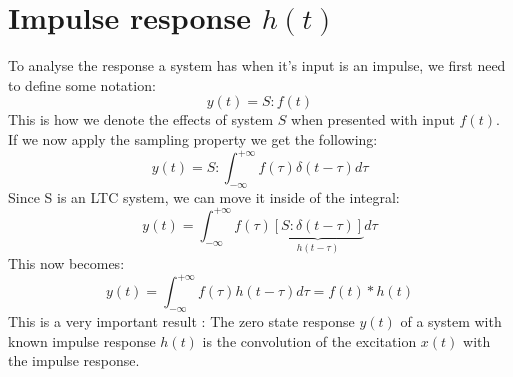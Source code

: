 \documentclass[]{subfiles}
\begin{document}
	\section{Impulse response $h(t)$}
	To analyse the response a system has when it's input is an impulse, we first need to define some notation:
	\begin{equation}
		y(t) = S:f(t)
	\end{equation}
	This is how we denote the effects of  system $S$ when presented with input $f(t)$.   If we now apply the sampling property we get the following:
	\begin{equation}
		y(t)=S:\int_{-\infty}^{+\infty}f(\tau)\delta(t-\tau)d\tau
	\end{equation}
	Since S is an LTC system, we can move it inside of the integral:
	\begin{equation}
		y(t)=\int_{-\infty}^{+\infty}f(\tau)\underbrace{\left[ S:\delta(t-\tau)\right] }_{h(t-\tau)}d\tau
	\end{equation}
	This now becomes:
	\begin{equation}
		y(t)=\int_{-\infty}^{+\infty}f(\tau)h(t-\tau)d\tau=f(t)\ast h(t)
	\end{equation}
	This is a very important result : The zero  state  response  $y(t)$  of  a system  with  known  impulse  response $ h(t)$  is  the convolution of the excitation $x(t)$  with the impulse response. 
\end{document}
